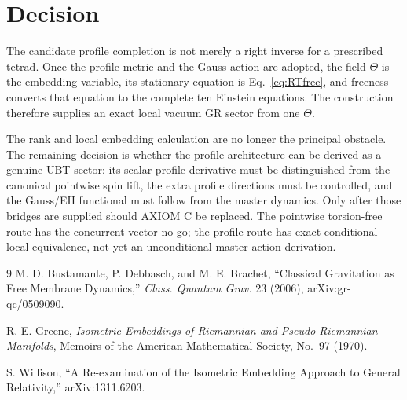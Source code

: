 \documentclass[11pt,a4paper]{article}
\theoremstyle{remark}
\begin{document}
\section{Decision}

The candidate profile completion is not merely a right inverse for a prescribed
tetrad.  Once the profile metric and the Gauss action are adopted, the field
$\Theta$ is the embedding variable, its stationary equation is
Eq.~\eqref{eq:RTfree}, and freeness converts that equation to the complete ten
Einstein equations.  The construction therefore supplies an exact local
vacuum GR sector from one $\Theta$.

The rank and local embedding calculation are no longer the principal
obstacle.  The remaining decision is whether the profile architecture can be
derived as a genuine UBT sector: its scalar-profile derivative must be
distinguished from the canonical pointwise spin lift, the extra profile
directions must be controlled, and the Gauss/EH functional must follow from
the master dynamics.  Only after those bridges are supplied should AXIOM C be
replaced.  The pointwise torsion-free route has the concurrent-vector no-go;
the profile route has exact conditional local equivalence, not yet an
unconditional master-action derivation.

\begin{thebibliography}{9}
M. D. Bustamante, P. Debbasch, and M. E. Brachet,
``Classical Gravitation as Free Membrane Dynamics,''
\emph{Class. Quantum Grav.} 23 (2006), arXiv:gr-qc/0509090.

R. E. Greene,
\emph{Isometric Embeddings of Riemannian and Pseudo-Riemannian Manifolds},
Memoirs of the American Mathematical Society, No.~97 (1970).

S. Willison,
``A Re-examination of the Isometric Embedding Approach to General Relativity,''
arXiv:1311.6203.
\end{thebibliography}
\end{document}

